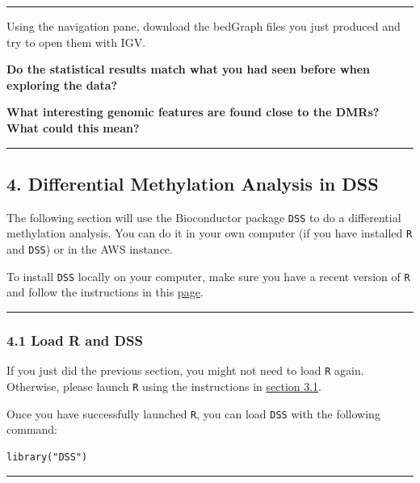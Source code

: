 \documentclass[
]{book}
\begin{document}
\begin{center}\rule{0.5\linewidth}{0.5pt}\end{center}

Using the navigation pane, download the bedGraph files you just produced and try to open them with IGV.

\textbf{Do the statistical results match what you had seen before when exploring the data?}

\textbf{What interesting genomic features are found close to the DMRs? What could this mean?}

\begin{center}\rule{0.5\linewidth}{0.5pt}\end{center}

\subsection{4. Differential Methylation Analysis in DSS}\label{differential-methylation-analysis-in-dss}

The following section will use the Bioconductor package \texttt{DSS} to do a differential methylation analysis.
You can do it in your own computer (if you have installed \texttt{R} and \texttt{DSS}) or in the AWS instance.

To install \texttt{DSS} locally on your computer, make sure you have a recent version of \texttt{R} and
follow the instructions in this \href{https://bioconductor.org/packages/release/bioc/html/DSS.html}{page}.

\begin{center}\rule{0.5\linewidth}{0.5pt}\end{center}

\subsubsection{4.1 Load R and DSS}\label{load-r-and-dss}

If you just did the previous section, you might not need to load \texttt{R} again. Otherwise, please launch \texttt{R} using the instructions in \hyperref[load_methylkit_r]{section 3.1}.

Once you have successfully launched \texttt{R}, you can load \texttt{DSS} with the following command:

\begin{verbatim}
library("DSS") 
\end{verbatim}

\begin{center}\rule{0.5\linewidth}{0.5pt}\end{center}
\end{document}
